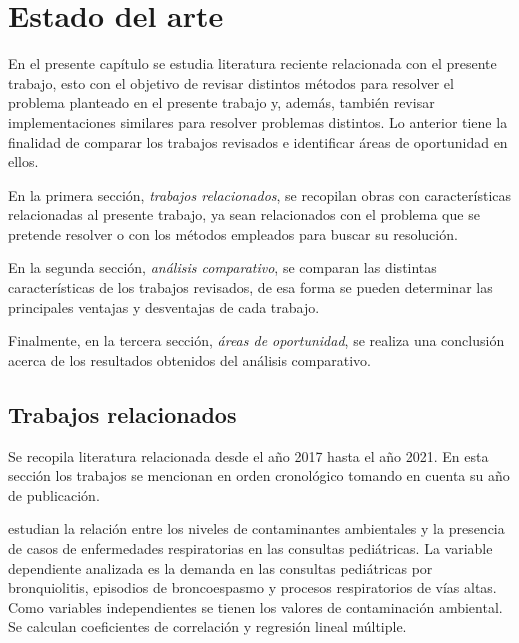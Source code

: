 

\chapter{Estado del arte}
En el presente capítulo se estudia literatura reciente relacionada con el presente trabajo, esto con el objetivo de revisar distintos métodos para resolver el problema planteado en el presente trabajo y, además, también revisar implementaciones similares para resolver problemas distintos. Lo anterior tiene la finalidad de comparar los trabajos revisados e identificar áreas de oportunidad en ellos.

En la primera sección, \emph{trabajos relacionados}, se recopilan obras con características relacionadas al presente trabajo, ya sean relacionados con el problema que se pretende resolver o con los métodos empleados para buscar su resolución.

En la segunda sección, \emph{análisis comparativo}, se comparan las distintas características de los trabajos revisados, de esa forma se pueden determinar las principales ventajas y desventajas de cada trabajo. 

Finalmente, en la tercera sección, \emph{áreas de oportunidad}, se realiza una conclusión acerca de los resultados obtenidos del análisis comparativo.

\clearpage
\section{Trabajos relacionados}
Se recopila literatura relacionada desde el año 2017 hasta el año 2021. En esta sección los trabajos se mencionan en orden cronológico tomando en cuenta su año de publicación.

\citet{r12} estudian la relación entre los niveles de contaminantes ambientales y la presencia de casos de enfermedades respiratorias en las consultas pediátricas. La variable dependiente analizada es la demanda en las consultas pediátricas por bronquiolitis, episodios de broncoespasmo y procesos respiratorios de vías altas. Como variables independientes se tienen los valores de contaminación ambiental. Se calculan coeficientes de correlación y regresión lineal múltiple.

